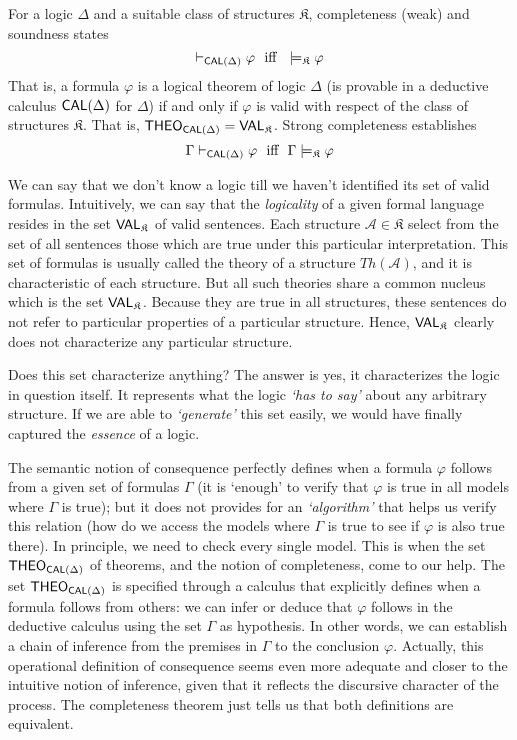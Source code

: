 For a logic $\Delta$ and a suitable class of structures $\mathfrak{K}$,
completeness (weak) and soundness states%
$$
\vdash _{\CAL(\Delta)}\varphi \ \ \text{iff}\ \ \models _{\mathfrak{K}%
}\varphi
$$
That is, a formula $\varphi $ is a logical theorem of logic $\Delta$ (is
provable in a deductive calculus $\textsf{CAL}(\Delta)$ for $\Delta$) if and only
if $\varphi$ is valid with respect of the class of structures $\mathfrak{K}$. That is, $\textsf{THEO}_{\textsf{CAL}(\Delta)} = \textsf{VAL}_{\mathfrak{K}}$. Strong completeness
establishes 
$$
\Gamma \vdash _{\textsf{CAL}(\Delta)}\varphi \ \ \text{iff}\ \ \Gamma 
\models _{\mathfrak{K}}\varphi
$$

We can say that we don't know a logic till we haven't identified its set of
valid formulas. Intuitively, we can say that the \emph{logicality} of a
given formal language resides in the set $\textsf{VAL}_{\mathfrak{K}}$ of valid
sentences. Each structure $\mathcal{A}\in \mathfrak{K}$ select from the set
of all sentences those which are true under this particular interpretation.
This set of formulas is usually called the theory of a structure 
$Th(\mathcal{A})$, and it is characteristic of each structure. But all such
theories share a common nucleus which is the set $\textsf{VAL}_{\mathfrak{K}}$.
Because they are true in all structures, these sentences do not refer to
particular properties of a particular structure. Hence, $\textsf{VAL}_{\mathfrak{K}}$
clearly does not characterize any particular structure.

Does this set characterize anything?  The answer is yes, it characterizes the logic in question itself. It
represents what the logic \emph{`has to say'} about any arbitrary
structure. If we are able to \emph{`generate'} this set easily, we would
have finally captured the \emph{essence} of a logic.

The semantic notion of consequence perfectly defines when a formula $\varphi 
$ follows from a given set of formulas $\Gamma $ (it is `enough' to verify
that $\varphi $ is true in all models where $\Gamma $ is true); but it does
not provides for an \emph{`algorithm'} that helps us verify this relation
(how do we access the models where $\Gamma $ is true to see if $\varphi$ is
also true there). In principle, we need to check every single model. This is
when the set $\textsf{THEO}_{\textsf{CAL}(\Delta)}$ of theorems, and the notion of
completeness, come to our help. The set $\textsf{THEO}_{\textsf{CAL}(\Delta)}$ is specified
through a calculus that explicitly defines when a formula follows from
others: we can infer or deduce that $\varphi $ follows in the deductive
calculus using the set $\Gamma$ as hypothesis. In other words, we can
establish a chain of inference from the premises in $\Gamma$ to the
conclusion $\varphi$. Actually, this operational definition of consequence
seems even more adequate and closer to the intuitive notion of inference,
given that it reflects the discursive character of the process. The
completeness theorem just tells us that both definitions are equivalent.

